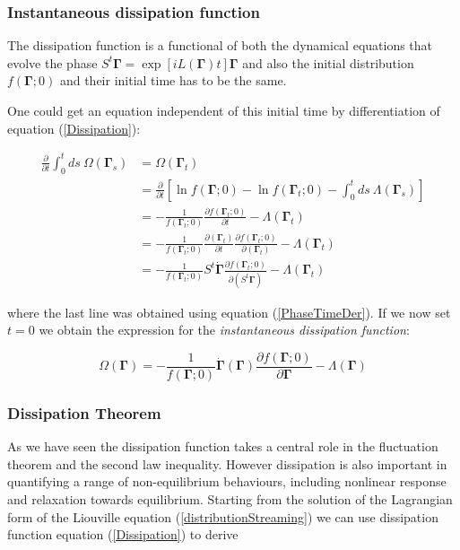 \documentclass[a4paper,12pt]{article}
\begin{document}

\subsubsection{Instantaneous dissipation function}

The dissipation function is a functional of both the dynamical equations that evolve the phase $S^t \bm{\Gamma} = \exp[iL(\bm{\Gamma})t]\bm{\Gamma}$ and also the initial distribution $f(\bm{\Gamma};0)$ and their initial time has to be the same.

One could get an equation independent of this initial time by differentiation of equation (\ref{Dissipation}):

\begin{equation}
\begin{aligned}
  \frac{\partial}{\partial t}\int_0^t ds\ \Omega(\bm{\Gamma}_s) &= \Omega(\bm{\Gamma}_t)\\
  &=\frac{\partial}{\partial t}[\ln{f(\bm{\Gamma};0)}-\ln{f(\bm{\Gamma}_t;0)}
-\int_0^t ds \ \Lambda(\bm{\Gamma}_s)
]\\
&=-\frac{1}{f(\bm{\Gamma}_t;0)}\frac{\partial f(\bm{\Gamma}_t;0)}{\partial t}-\Lambda( \bm{\Gamma}_t)\\
&=-\frac{1}{f(\bm{\Gamma}_t;0)}\frac{\partial(  \bm{\Gamma}_t)}{\partial t}\frac{\partial f(\bm{\Gamma}_t;0)}{\partial(\bm{\Gamma}_t)}-\Lambda(\bm{\Gamma}_t)\\
&=-\frac{1}{f(\bm{\Gamma}_t;0)}S^t\dot{\bm{\Gamma}}
\frac{\partial f(\bm{\Gamma}_t;0)}{\partial(S^t \bm{\Gamma})}-\Lambda( \bm{\Gamma}_t)
\end{aligned}
\end{equation}

where the last line was obtained using equation (\ref{PhaseTimeDer}). 
If we now set $t=0$ we obtain the expression for the \textit{instantaneous dissipation function}:

\begin{equation}
  \Omega(\bm{\Gamma})=-\frac{1}{f(\bm{\Gamma};0)}\dot{\bm{\Gamma}}(\bm{\Gamma})\frac{\partial{f(\bm{\Gamma};0)}}{\partial{\bm{\Gamma}}}-\Lambda(\bm{\Gamma})
\end{equation}

\subsubsection{Dissipation Theorem}
\label{DissipationTheoremSection}
As we have seen the dissipation function takes a central role in the fluctuation theorem and the second law inequality. However dissipation is also important in quantifying a range of non-equilibrium behaviours, including nonlinear response and relaxation towards equilibrium.
Starting from the solution of the Lagrangian form of the Liouville equation (\ref{distributionStreaming}) we can use dissipation function equation (\ref{Dissipation}) to derive
\end{document}
